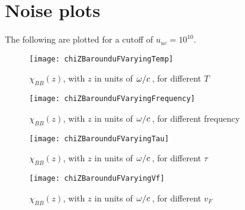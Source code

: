 \documentclass[11pt]{article}
\begin{document}
	\section{Noise plots} \label{sec:plots}

	The following are plotted for a cutoff of $u_{uc} = 10^{10}$.

	\begin{figure}[htp]
		\centering
		\texttt{[image: chiZBarounduFVaryingTemp]}
		\caption{$\chi_{BB}(z)$, with $z$ in units of $\flatfrac{\omega}{c}$, for different $T$} \label{fig:temp}
	\end{figure}

	\begin{figure}[htp]
		\centering
		\texttt{[image: chiZBarounduFVaryingFrequency]}
		\caption{$\chi_{BB}(z)$, with $z$ in units of $\flatfrac{\omega}{c}$, for different frequency} \label{fig:frequency}
	\end{figure}

	\begin{figure}[htp]
		\centering
		\texttt{[image: chiZBarounduFVaryingTau]}
		\caption{$\chi_{BB}(z)$, with $z$ in units of $\flatfrac{\omega}{c}$, for different $\tau$} \label{fig:tau}
	\end{figure}

	\begin{figure}[htp]
		\centering
		\texttt{[image: chiZBarounduFVaryingVf]}
		\caption{$\chi_{BB}(z)$, with $z$ in units of $\flatfrac{\omega}{c}$, for different $v_F$} \label{fig:vf}
	\end{figure}

	\newpage
	\listoftodos
	\newpage
	\printbibliography
\end{document}
